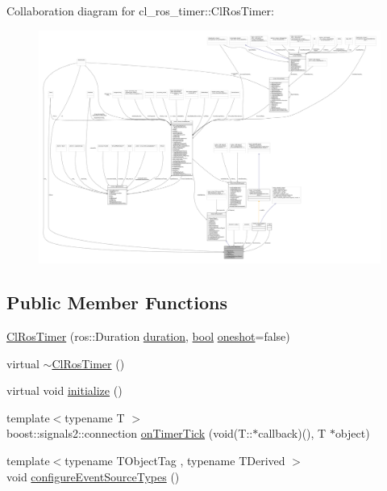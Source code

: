 Collaboration diagram for cl\+\_\+ros\+\_\+timer\+:\+:Cl\+Ros\+Timer\+:
\nopagebreak
\begin{figure}[H]
\begin{center}
\leavevmode
\includegraphics[width=350pt]{classcl__ros__timer_1_1ClRosTimer__coll__graph}
\end{center}
\end{figure}
\subsection*{Public Member Functions}
\begin{DoxyCompactItemize}
\item 
\hyperlink{classcl__ros__timer_1_1ClRosTimer_afd99658be9585d467a05238a2dd604da}{Cl\+Ros\+Timer} (ros\+::\+Duration \hyperlink{classcl__ros__timer_1_1ClRosTimer_a39a5666044409eca94562fcceca8b0ea}{duration}, \hyperlink{classbool}{bool} \hyperlink{classcl__ros__timer_1_1ClRosTimer_a07ce4ac2560aa7ad4b5dee233f2d7733}{oneshot}=false)
\item 
virtual \hyperlink{classcl__ros__timer_1_1ClRosTimer_a94a600197795e0235e86461a90c8cd7d}{$\sim$\+Cl\+Ros\+Timer} ()
\item 
virtual void \hyperlink{classcl__ros__timer_1_1ClRosTimer_a874e97a9e3e974966ac4999e0a293e73}{initialize} ()
\item 
{\footnotesize template$<$typename T $>$ }\\boost\+::signals2\+::connection \hyperlink{classcl__ros__timer_1_1ClRosTimer_a7edcc057bfb5a25fe0892755137dd8da}{on\+Timer\+Tick} (void(T\+::$\ast$callback)(), T $\ast$object)
\item 
{\footnotesize template$<$typename T\+Object\+Tag , typename T\+Derived $>$ }\\void \hyperlink{classcl__ros__timer_1_1ClRosTimer_a6d62a8425ed60035269ded2b5cb7590d}{configure\+Event\+Source\+Types} ()
\end{DoxyCompactItemize}
